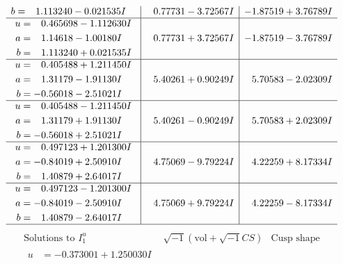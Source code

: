 \documentclass[1p]{elsarticle_modified}
\theoremstyle{definition}
\newcommand{\I}{\sqrt{-1}}
\begin{document}
$$\begin{array}{c|c|c}
\begin{aligned}
b &= \phantom{-}1.113240 - 0.021535 I\end{aligned}
 & \phantom{-}0.77731 - 3.72567 I & -1.87519 + 3.76789 I \\ \hline\begin{aligned}
u &= \phantom{-}0.465698 - 1.112630 I \\
a &= \phantom{-}1.14618 - 1.00180 I \\
b &= \phantom{-}1.113240 + 0.021535 I\end{aligned}
 & \phantom{-}0.77731 + 3.72567 I & -1.87519 - 3.76789 I \\ \hline\begin{aligned}
u &= \phantom{-}0.405488 + 1.211450 I \\
a &= \phantom{-}1.31179 - 1.91130 I \\
b &= -0.56018 - 2.51021 I\end{aligned}
 & \phantom{-}5.40261 + 0.90249 I & \phantom{-}5.70583 - 2.02309 I \\ \hline\begin{aligned}
u &= \phantom{-}0.405488 - 1.211450 I \\
a &= \phantom{-}1.31179 + 1.91130 I \\
b &= -0.56018 + 2.51021 I\end{aligned}
 & \phantom{-}5.40261 - 0.90249 I & \phantom{-}5.70583 + 2.02309 I \\ \hline\begin{aligned}
u &= \phantom{-}0.497123 + 1.201300 I \\
a &= -0.84019 + 2.50910 I \\
b &= \phantom{-}1.40879 + 2.64017 I\end{aligned}
 & \phantom{-}4.75069 - 9.79224 I & \phantom{-}4.22259 + 8.17334 I \\ \hline\begin{aligned}
u &= \phantom{-}0.497123 - 1.201300 I \\
a &= -0.84019 - 2.50910 I \\
b &= \phantom{-}1.40879 - 2.64017 I\end{aligned}
 & \phantom{-}4.75069 + 9.79224 I & \phantom{-}4.22259 - 8.17334 I\\
 \hline 
 \end{array}$$\newpage$$\begin{array}{c|c|c}  
\text{Solutions to }I^u_{1}& \I (\text{vol} + \sqrt{-1}CS) & \text{Cusp shape}\\
 \hline 
\begin{aligned}
u &= -0.373001 + 1.250030 I \\

\end{aligned}
\end{array}$$
\end{document}
